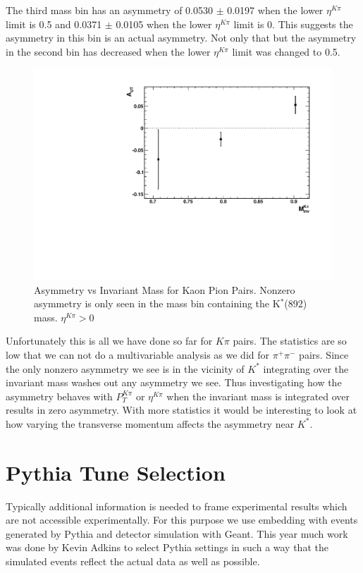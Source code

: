 \documentclass[abstract = on,listof=totoc, bibliography=totoc]{scrreprt}
\newcommand{\pip}{\pi^+}
\newcommand{\pim}{\pi^-}
\newcommand{\pair}{$\pip\pim$ }
\newcommand{\etakp}{\eta^{K\pi}}
\newcommand{\ptkp}{P_{T}^{K\pi}}
\begin{document}
The third mass bin has an asymmetry of 0.0530 $\pm$ 0.0197 when the lower $\etakp$ limit is 0.5 and 0.0371 $\pm$ 0.0105 when the lower $\etakp$ limit is 0. This suggests the asymmetry in this bin is an actual asymmetry. Not only that but the asymmetry in the second bin has decreased when the lower $\etakp$ limit was changed to 0.5. 


\begin{figure}
\begin{center}
\includegraphics[width = .6\textwidth]{AsymVsM_eta050}
\caption[Asymmetry vs Invariant Mass for Kaon Pion Pairs]{Asymmetry vs Invariant Mass for Kaon Pion Pairs. Nonzero asymmetry is only seen in the mass bin containing the K$^*$(892) mass. $\etakp > 0$}
\label{fig:AutVMass_KPi_eta050}
\end{center}
\end{figure}

Unfortunately this is all we have done so far for $K\pi$ pairs. The statistics are so low that we can not do a multivariable analysis as we did for \pair pairs. Since the only nonzero asymmetry we see is in the vicinity of $K^*$ integrating over the invariant mass washes out any asymmetry we see. Thus investigating how the asymmetry behaves with $\ptkp$ or $\etakp$ when the invariant mass is integrated over results in zero asymmetry. With more statistics it would be interesting to look at how varying the transverse momentum affects the asymmetry near $K^*$.  


\chapter{Pythia Tune Selection}

Typically additional information is needed to frame experimental results which are not accessible experimentally. For this purpose we use embedding with events generated by  Pythia and detector simulation with Geant. This year much work was done by Kevin Adkins to select Pythia settings in such a way that the simulated events reflect the actual data as well as possible. 
\end{document}
